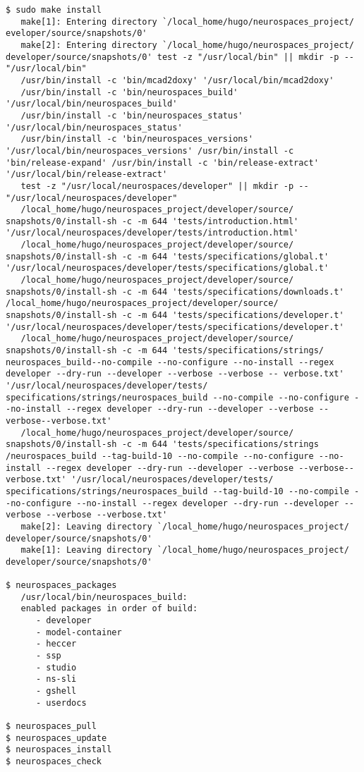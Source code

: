 \documentclass[12pt]{article}
\begin{document}
\begin{enumerate}
\begin{verbatim}
$ sudo make install
   make[1]: Entering directory `/local_home/hugo/neurospaces_project/ eveloper/source/snapshots/0'
   make[2]: Entering directory `/local_home/hugo/neurospaces_project/ developer/source/snapshots/0' test -z "/usr/local/bin" || mkdir -p -- "/usr/local/bin"
   /usr/bin/install -c 'bin/mcad2doxy' '/usr/local/bin/mcad2doxy'
   /usr/bin/install -c 'bin/neurospaces_build' '/usr/local/bin/neurospaces_build'
   /usr/bin/install -c 'bin/neurospaces_status' '/usr/local/bin/neurospaces_status'
   /usr/bin/install -c 'bin/neurospaces_versions' '/usr/local/bin/neurospaces_versions' /usr/bin/install -c 'bin/release-expand' /usr/bin/install -c 'bin/release-extract' '/usr/local/bin/release-extract'
   test -z "/usr/local/neurospaces/developer" || mkdir -p -- "/usr/local/neurospaces/developer"
   /local_home/hugo/neurospaces_project/developer/source/ snapshots/0/install-sh -c -m 644 'tests/introduction.html' '/usr/local/neurospaces/developer/tests/introduction.html'
   /local_home/hugo/neurospaces_project/developer/source/ snapshots/0/install-sh -c -m 644 'tests/specifications/global.t' '/usr/local/neurospaces/developer/tests/specifications/global.t'
   /local_home/hugo/neurospaces_project/developer/source/ snapshots/0/install-sh -c -m 644 'tests/specifications/downloads.t' /local_home/hugo/neurospaces_project/developer/source/ snapshots/0/install-sh -c -m 644 'tests/specifications/developer.t'  '/usr/local/neurospaces/developer/tests/specifications/developer.t'
   /local_home/hugo/neurospaces_project/developer/source/ snapshots/0/install-sh -c -m 644 'tests/specifications/strings/ neurospaces_build--no-compile --no-configure --no-install --regex developer --dry-run --developer --verbose --verbose -- verbose.txt' '/usr/local/neurospaces/developer/tests/ specifications/strings/neurospaces_build --no-compile --no-configure --no-install --regex developer --dry-run --developer --verbose --verbose--verbose.txt'
   /local_home/hugo/neurospaces_project/developer/source/ snapshots/0/install-sh -c -m 644 'tests/specifications/strings /neurospaces_build --tag-build-10 --no-compile --no-configure --no-install --regex developer --dry-run --developer --verbose --verbose--verbose.txt' '/usr/local/neurospaces/developer/tests/ specifications/strings/neurospaces_build --tag-build-10 --no-compile --no-configure --no-install --regex developer --dry-run --developer --verbose --verbose --verbose.txt'
   make[2]: Leaving directory `/local_home/hugo/neurospaces_project/ developer/source/snapshots/0'
   make[1]: Leaving directory `/local_home/hugo/neurospaces_project/ developer/source/snapshots/0'

$ neurospaces_packages
   /usr/local/bin/neurospaces_build:
   enabled packages in order of build:
      - developer
      - model-container
      - heccer
      - ssp
      - studio
      - ns-sli
      - gshell
      - userdocs

$ neurospaces_pull
$ neurospaces_update
$ neurospaces_install
$ neurospaces_check
\end{verbatim}
\end{enumerate}
\end{document}
